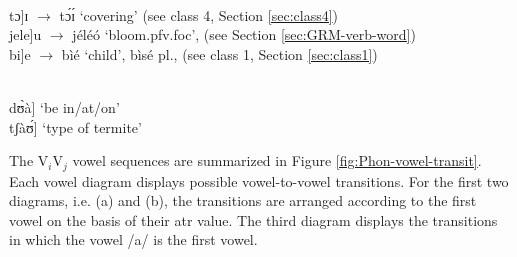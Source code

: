 \begin{exe}
\ex\label{ex:V1V2vowel-seq}
\begin{xlist}

\ex   {\rm  V$_{i}$]-V$_{j}$ : a morpheme boundary intervenes}\\
tɔ]ɪ   $\rightarrow$ tɔ́ɪ́   {\rm `covering'} {\rm (see {\sc class 4},  
Section \ref{sec:class4})}\\
jele]u $\rightarrow$  jéléó  {\rm `bloom.{\sc pfv.foc}}', 
{\rm (see Section  \ref{sec:GRM-verb-word})} \\  
bi]e	 $\rightarrow$ bìé     {\rm `child'},   bìsé  {\sc pl.},     
 {\rm  (see {\sc class 1},  
Section \ref{sec:class1})}	

\\
 dʊ̀à]    {\rm `be in/at/on'}\\
tʃàʊ́]    {\rm  `type of termite'}

\end{xlist}
\end{exe}

The V$_{i}$V$_{j}$ vowel sequences are  summarized in Figure 
\ref{fig:Phon-vowel-transit}.  Each vowel diagram displays possible 
vowel-to-vowel transitions. For the first two diagrams, i.e. (a) and (b), the 
transitions are arranged according to the first vowel on the basis of their {\sc 
atr} value. The third diagram displays the transitions in which the vowel /a/  is the first vowel. 

